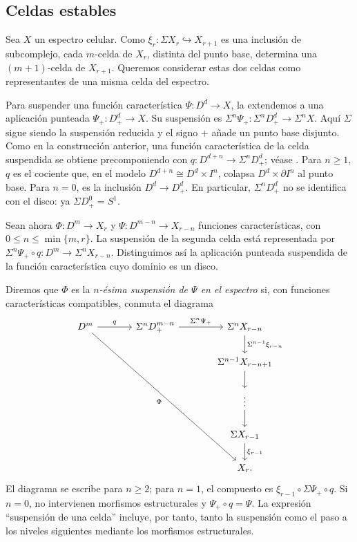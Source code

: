 \subsection{Celdas estables}

Sea $X$ un espectro celular. Como $\xi_r\colon\Sigma X_r\hookrightarrow X_{r+1}$ es una inclusión de subcomplejo, cada $m$-celda de $X_r$, distinta del punto base, determina una $(m+1)$-celda de $X_{r+1}$. Queremos considerar estas dos celdas como representantes de una misma celda del espectro.

Para suspender una función característica $\Psi\colon D^d\to X$, la extendemos a una aplicación punteada $\Psi_+\colon D^d_+\to X$. Su suspensión es $\Sigma^n\Psi_+\colon\Sigma^nD^d_+\to\Sigma^nX$. Aquí $\Sigma$ sigue siendo la suspensión reducida y el signo $+$ añade un punto base disjunto. Como en la construcción anterior, una función característica de la celda suspendida se obtiene precomponiendo con $q\colon D^{d+n}\to\Sigma^nD^d_+$; véase \cite[Lema~2.6.1.1]{malkiewich}. Para $n\ge1$, $q$ es el cociente que, en el modelo $D^{d+n}\cong D^d\times I^n$, colapsa $D^d\times\partial I^n$ al punto base. Para $n=0$, es la inclusión $D^d\to D^d_+$. En particular, $\Sigma^nD^d_+$ no se identifica con el disco: ya $\Sigma D^0_+=S^1$.\label{nota:c10-suspension-celda}

Sean ahora $\Phi\colon D^m\to X_r$ y $\Psi\colon D^{m-n}\to X_{r-n}$ funciones características, con $0\le n\le\min\{m,r\}$. La suspensión de la segunda celda está representada por $\Sigma^n\Psi_+\circ q\colon D^m\to\Sigma^nX_{r-n}$. Distinguimos así la aplicación punteada suspendida de la función característica cuyo dominio es un disco.

Diremos que $\Phi$ es la \emph{$n$-ésima suspensión de $\Psi$ en el espectro} si, con funciones características compatibles, conmuta el diagrama
\[
\begin{tikzcd}[column sep=large]
D^m \arrow[r,"q"] \arrow[ddddrr,"\Phi"']
& \Sigma^nD^{m-n}_+ \arrow[r,"\Sigma^n\Psi_+"]
& \Sigma^nX_{r-n}
\arrow[d,"\Sigma^{n-1}\xi_{r-n}"]\\
&& \Sigma^{n-1}X_{r-n+1} \arrow[d]\\
&& \vdots \arrow[d]\\
&& \Sigma X_{r-1} \arrow[d,"\xi_{r-1}"]\\
&& X_r.
\end{tikzcd}
\]
El diagrama se escribe para $n\ge2$; para $n=1$, el compuesto es $\xi_{r-1}\circ\Sigma\Psi_+\circ q$. Si $n=0$, no intervienen morfismos estructurales y $\Psi_+\circ q=\Psi$. La expresión ``suspensión de una celda'' incluye, por tanto, tanto la suspensión como el paso a los niveles siguientes mediante los morfismos estructurales.

